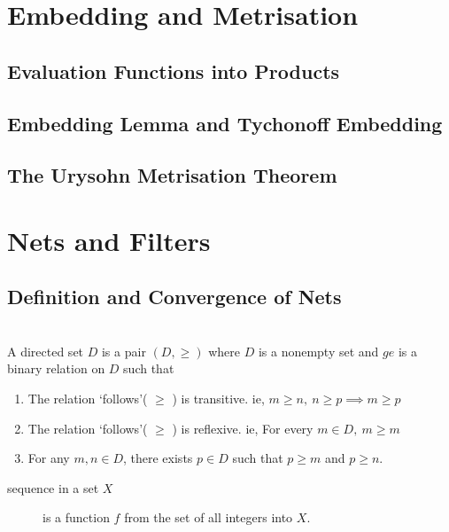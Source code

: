 \section{Embedding and Metrisation}
\subsection{Evaluation Functions into Products}
\subsection{Embedding Lemma and Tychonoff Embedding}
\subsection{The Urysohn Metrisation Theorem}

\section{Nets and Filters}
\subsection{Definition and Convergence of Nets}
\begin{definition}\cite[10.1.1]{joshi}\\
	A directed set \(D\) is a pair \( (D,\ge) \) where \( D \) is a nonempty set and  \( ge \) is a binary relation on \( D \) such that
	\begin{enumerate}%
		\item The relation `follows'( \( \ge \) ) is transitive. ie,  \( m \ge n,\ n \ge p \implies m \ge p \)
		\item The relation `follows'( \( \ge \) ) is reflexive. ie, For every \( m \in D,\ m \ge m \)
		\item For any \( m,n \in D \), there exists \( p \in D \) such that \( p \ge m \) and \( p \ge n \).
	\end{enumerate}
\end{definition}

\begin{description}
	\item[sequence in a set \( X \)] is a function \( f \) from the set of all integers into \( X \).
\end{description}

